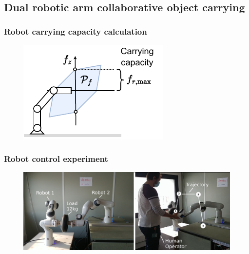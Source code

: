 

\subsection{Dual robotic arm collaborative object carrying}\label{ch:robot_robot_carrying}


\subsubsection{Robot carrying capacity calculation}

\begin{figure}[!h]
    \centering
    \includegraphics[width=0.4\linewidth]{Papers/images/carrying_capacity_robot.pdf}
    \caption{}
    \label{fig:collaboartion_schema}
\end{figure}


\subsubsection{Robot control experiment}

\begin{figure}[!h]
    \centering
    \includegraphics[width=\linewidth]{Papers/images/exp1_explication.png}
    \caption{}
    \label{fig:experiment1}
\end{figure}


